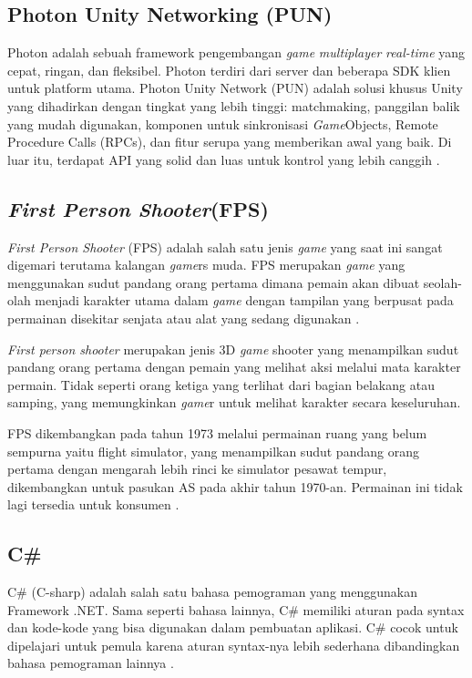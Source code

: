 \subsection{Photon Unity Networking (PUN)}
\noindent

Photon adalah sebuah framework pengembangan \textit{game} \textit{multiplayer} \textit{real-time} yang cepat, ringan, dan fleksibel. Photon terdiri dari server dan beberapa SDK klien untuk platform utama.
Photon Unity Network (PUN) adalah solusi khusus Unity yang dihadirkan dengan tingkat yang lebih tinggi: matchmaking, panggilan balik yang mudah digunakan, komponen untuk sinkronisasi \textit{Game}Objects, Remote Procedure Calls (RPCs), dan fitur serupa yang memberikan awal yang baik. Di luar itu, terdapat API yang solid dan luas untuk kontrol yang lebih canggih \cite{pun}.

\subsection{\textit{First Person Shooter}(FPS)}
\noindent

\textit{First Person Shooter} (FPS) adalah salah satu jenis \textit{game} yang saat ini sangat digemari terutama kalangan \textit{game}rs muda. FPS merupakan \textit{game} yang menggunakan sudut pandang orang pertama dimana pemain akan dibuat seolah-olah menjadi karakter utama dalam \textit{game} dengan tampilan yang berpusat pada permainan disekitar senjata atau alat yang sedang digunakan \cite{fps}.

\textit{First person shooter} merupakan jenis 3D \textit{game} shooter yang menampilkan sudut pandang orang pertama dengan 
pemain yang melihat aksi melalui mata karakter permain. Tidak seperti orang ketiga yang terlihat dari bagian 
belakang atau samping, yang memungkinkan \textit{game}r untuk melihat karakter secara keseluruhan\cite{fps}.

FPS dikembangkan pada tahun 1973 melalui permainan ruang yang belum sempurna yaitu flight simulator, yang 
menampilkan sudut pandang orang pertama dengan mengarah lebih rinci ke simulator pesawat tempur, dikembangkan untuk pasukan AS pada akhir tahun 1970-an. Permainan ini tidak lagi tersedia untuk konsumen \cite{fps}.

\subsection{C\#}
\noindent

C\# (C-sharp) adalah salah satu bahasa pemograman yang menggunakan Framework .NET. Sama seperti 
bahasa lainnya, C\# memiliki aturan pada syntax dan kode-kode yang bisa digunakan dalam pembuatan aplikasi. 
C\# cocok untuk dipelajari untuk pemula karena aturan syntax-nya lebih sederhana dibandingkan bahasa 
pemograman lainnya \cite{Ansori}.

